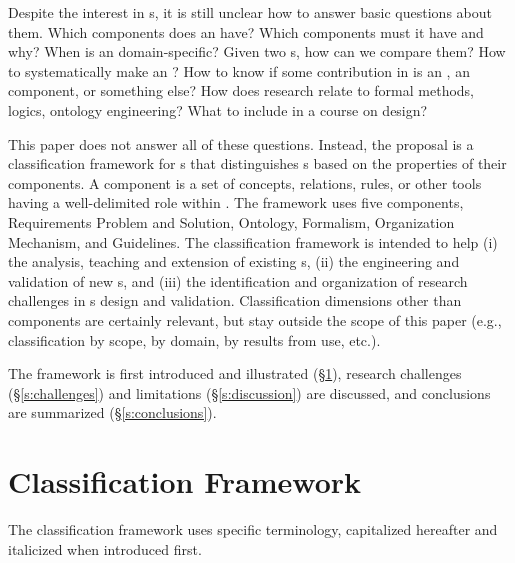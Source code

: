 \documentclass[10pt, final, conference, compsocconf]{IEEEtran}
\begin{document}
Despite the interest in s, it is still unclear how to answer basic questions about them. Which components does an  have? Which components must it have and why? When is an  domain-specific? Given two s, how can we compare them? How to systematically make an ? How to know if some contribution in  is an , an  component, or something else? How does  research relate to formal methods, logics, ontology engineering? What to include in a course on  design?



This paper does not answer all of these questions. Instead, the proposal is a classification framework for s that distinguishes s based on the properties of their components. A component is a set of concepts, relations, rules, or other tools having a well-delimited role within . The framework uses five components, Requirements Problem and Solution, Ontology, Formalism, Organization Mechanism, and Guidelines. The classification framework is intended to help (i) the analysis, teaching and extension of existing s, (ii) the engineering and validation of new s, and (iii) the identification and organization of research challenges in s design and validation. Classification dimensions other than components are certainly relevant, but stay outside the scope of this paper (e.g., classification by scope, by domain, by results from use, etc.).

The framework is first introduced and illustrated (\S\ref{s:components}), research challenges (\S\ref{s:challenges}) and limitations (\S\ref{s:discussion}) are discussed, and conclusions are summarized (\S\ref{s:conclusions}).




\section{Classification Framework}\label{s:components}
The classification framework uses specific terminology, capitalized hereafter and italicized when introduced first.
\end{document}
